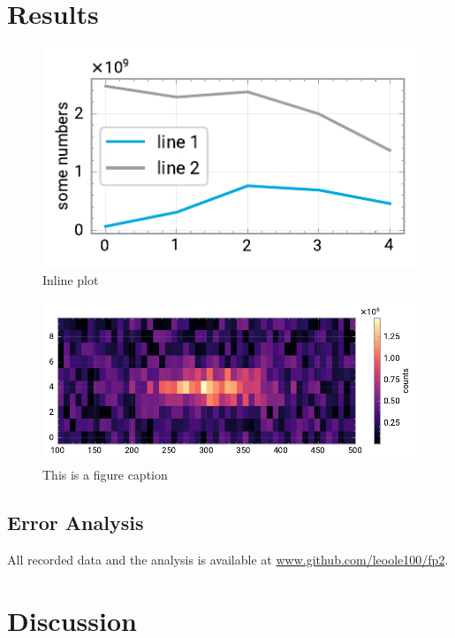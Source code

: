 \documentclass[
    parskip=half, 
    twoside=false,
    twocolumn=true
]{scrarticle}
\begin{document}
\section{Results}
\begin{figure}[H]
    \centering
    \includegraphics{fig/2024-10-01 line plot.pdf}
    \caption{Inline plot}
\end{figure}
\begin{figure}
    \centering \includegraphics{fig/2024-10-01 img plot.pdf}
    \caption{This is a figure caption}
\end{figure}
\blindtext[3]

\subsection{Error Analysis}
\blindtext

All recorded data and the analysis is available at \url{www.github.com/leoole100/fp2}.

\pagebreak
\section{Discussion}
\blindtext
\end{document}
